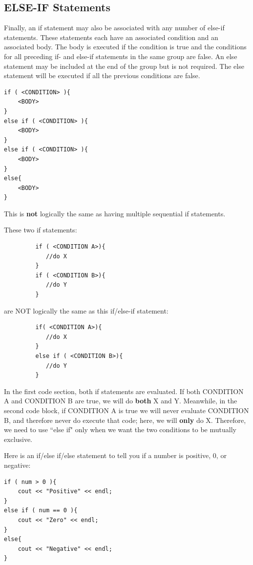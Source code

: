  \subsection{ELSE-IF Statements}
 
 Finally, an if statement may also be associated with any number of else-if statements. These statements each have an associated condition and an associated body. The body is executed if the condition is true and the conditions for all preceding if- and else-if statements in the same group are false. An else statement may be included at the end of the group but is not required. The else statement will be executed if all the previous conditions are false.

\begin{verbatim}
if ( <CONDITION> ){
    <BODY>
}
else if ( <CONDITION> ){
    <BODY>
}
else if ( <CONDITION> ){
    <BODY>
}
else{
    <BODY>
}
 \end{verbatim}

 This is \textbf{not} logically the same as having multiple sequential if statements. 

 \begin{example}
     These two if statements:
     \begin{verbatim}
         if ( <CONDITION A>){
            //do X
         }
         if ( <CONDITION B>){
            //do Y
         }
     \end{verbatim}
     are NOT logically the same as this if/else-if statement:
     \begin{verbatim}
         if( <CONDITION A>){
            //do X
         }
         else if ( <CONDITION B>){
            //do Y
         }
     \end{verbatim}
 \end{example}

 In the first code section, both if statements are evaluated. If both CONDITION A and CONDITION B are true, we will do \textbf{both} X and Y. Meanwhile, in the second code block, if CONDITION A is true we will never evaluate CONDITION B, and therefore never do execute that code; here, we will \textbf{only} do X. Therefore, we need to use ``else if" only when we want the two conditions to be mutually exclusive.

 \begin{example}
     Here is an if/else if/else statement to tell you if a number is positive, 0, or negative:
\begin{verbatim}
if ( num > 0 ){
    cout << "Positive" << endl;
}
else if ( num == 0 ){
    cout << "Zero" << endl;
}
else{
    cout << "Negative" << endl;
}
\end{verbatim}
 \end{example}

